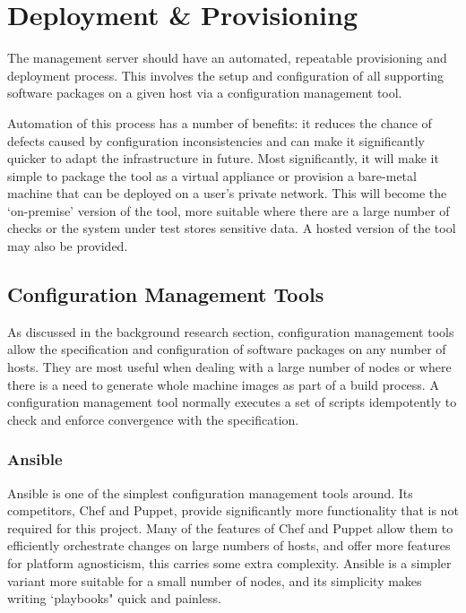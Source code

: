 \documentclass{cshonours}
\begin{document}
\pagebreak
\section{Deployment \& Provisioning}
\label{ansible}

The management server should have an automated, repeatable provisioning and deployment process. This involves the setup and configuration of all supporting software packages on a given host via a configuration management tool.

Automation of this process has a number of benefits: it reduces the chance of defects caused by configuration inconsistencies and can make it significantly quicker to adapt the infrastructure in future. Most significantly, it will make it simple to package the tool as a virtual appliance or provision a bare-metal machine that can be deployed on a user's private network. This will become the `on-premise' version of the tool, more suitable where there are a large number of checks or the system under test stores sensitive data. A hosted version of the tool may also be provided.

\subsection{Configuration Management Tools}

As discussed in the background research section, configuration management tools allow the specification and configuration of software packages on any number of hosts. They are most useful when dealing with a large number of nodes or where there is a need to generate whole machine images as part of a build process. A configuration management tool normally executes a set of scripts idempotently to check and enforce convergence with the specification.

\subsubsection{Ansible}

Ansible is one of the simplest configuration management tools around. Its competitors, Chef and Puppet, provide significantly more functionality that is not required for this project. Many of the features of Chef and Puppet allow them to efficiently orchestrate changes on large numbers of hosts, and offer more features for platform agnosticism, this carries some extra complexity. Ansible is a simpler variant more suitable for a small number of nodes, and its simplicity makes writing `playbooks" quick and painless.
\end{document}
